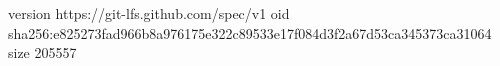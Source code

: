 version https://git-lfs.github.com/spec/v1
oid sha256:e825273fad966b8a976175e322c89533e17f084d3f2a67d53ca345373ca31064
size 205557
